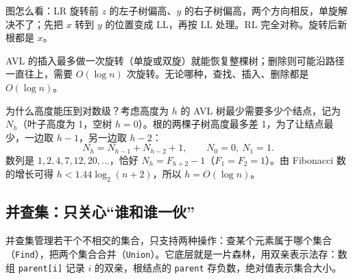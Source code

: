 \begin{center}
\smallskip
{\footnotesize\color{MutedText}图怎么看：LR 旋转前 $z$ 的左子树偏高、$y$ 的右子树偏高，两个方向相反，单旋解决不了；先把 $x$ 转到 $y$ 的位置变成 LL，再按 LL 处理。RL 完全对称。旋转后新根都是 $x$。}
\end{center}

AVL 的插入最多做一次旋转（单旋或双旋）就能恢复整棵树；删除则可能沿路径一直往上，需要 $O(\log n)$ 次旋转。无论哪种，查找、插入、删除都是 $O(\log n)$。

为什么高度能压到对数级？考虑高度为 $h$ 的 AVL 树最少需要多少个结点，记为 $N_h$（叶子高度为 1，空树 $h=0$）。根的两棵子树高度最多差 1，为了让结点最少，一边取 $h-1$，另一边取 $h-2$：
\[
N_h=N_{h-1}+N_{h-2}+1,\qquad N_0=0,\ N_1=1 .
\]
数列是 $1,2,4,7,12,20,\ldots$，恰好 $N_h=F_{h+2}-1$（$F_1=F_2=1$）。由 Fibonacci 数的增长可得 $h<1.44\log_2(n+2)$，所以 $h=O(\log n)$。

\subsection{并查集：只关心“谁和谁一伙”}

并查集管理若干个不相交的集合，只支持两种操作：查某个元素属于哪个集合（\texttt{Find}），把两个集合合并（\texttt{Union}）。它底层就是一片森林，用双亲表示法存：数组 \texttt{parent[i]} 记录 $i$ 的双亲，根结点的 \texttt{parent} 存负数，绝对值表示集合大小。

